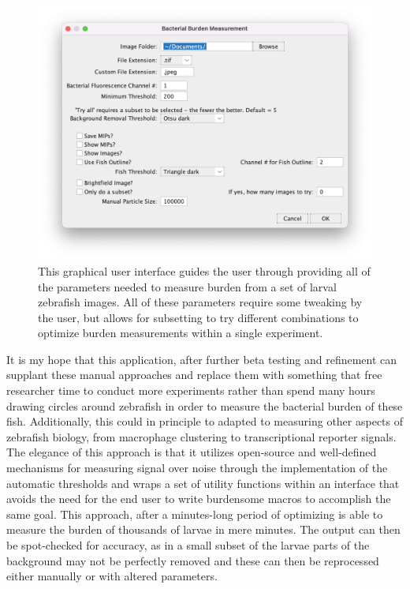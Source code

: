 \begin{figure}
\centering
\includegraphics[width=\textwidth]{images/burden_gui.png}
\caption{This graphical user interface guides the user through providing all of the parameters needed to measure burden from a set of larval zebrafish images. All of these parameters require some tweaking by the user, but allows for subsetting to try different combinations to optimize burden measurements within a single experiment.}
\label{figure:burdengui}
\end{figure}

It is my hope that this application, after further beta testing and refinement can supplant these manual approaches and replace them with something that free researcher time to conduct more experiments rather than spend many hours drawing circles around zebrafish in order to measure the bacterial burden of these fish. Additionally, this could in principle to adapted to measuring other aspects of zebrafish biology, from macrophage clustering to transcriptional reporter signals. The elegance of this approach is that it utilizes open\hyp{}source and well\hyp{}defined mechanisms for measuring signal over noise through the implementation of the automatic thresholds and wraps a set of utility functions within an interface that avoids the need for the end user to write burdensome macros to accomplish the same goal. This approach, after a minutes\hyp{}long period of optimizing is able to measure the burden of thousands of larvae in mere minutes. The output can then be spot\hyp{}checked for accuracy, as in a small subset of the larvae parts of the background may not be perfectly removed and these can then be reprocessed either manually or with altered parameters. 


